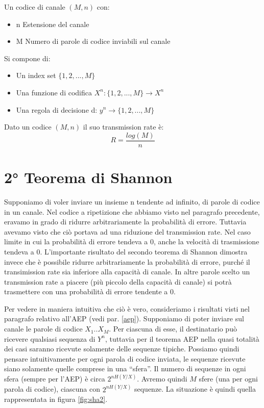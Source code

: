 \begin{definizione}
Un codice di canale $(M,n)$ con:
\begin{itemize}
 \item n Estensione del canale
 \item M Numero di parole di codice inviabili sul canale
\end{itemize}
Si compone di:
\begin{itemize}
 \item Un index set $\{1,2,...,M\}$
 \item Una funzione di codifica $X^n: \{1,2,...,M\} \to X^n$
 \item Una regola di decisione d: $y^n \to \{1,2,...,M\}$
\end{itemize}

\end{definizione}

\begin{osservazione}
 Dato un codice $(M,n)$ il suo transmission rate è:
\[
 R=\frac{log(M)}{n}
\]

\end{osservazione}

\section{2° Teorema di Shannon}
Supponiamo di voler inviare un insieme n tendente ad infinito, di parole di codice in un canale. Nel codice a ripetizione che abbiamo visto nel paragrafo precedente, eravamo in grado di ridurre arbitrariamente la probabilità di errore. Tuttavia avevamo visto che ciò 
portava ad una riduzione del transmission rate. Nel caso limite in cui la probabilità di errore tendeva a 0, anche la velocità di trasmissione tendeva a 0.
L'importante risultato del secondo teorema di Shannon dimostra invece che è possibile ridurre arbitrariamente la probabilità di errore, 
purché il transimission rate sia inferiore alla capacità di canale. In altre parole scelto un transmission rate a piacere (più piccolo della capacità di canale) si potrà trasmettere con una probabilità di errore tendente a 0.

Per vedere in maniera intuitiva che ciò è vero, consideriamo i risultati visti nel paragrafo relativo all'AEP (vedi par. \ref{aep}).
Supponiamo di poter inviare sul canale le parole di codice $X_1..X_M$. Per ciascuna di esse, il destinatario può ricevere qualsiasi 
sequenza di $Y^n$, tuttavia per il teorema AEP nella quasi totalità dei casi saranno ricevute solamente delle sequenze tipiche.
Possiamo quindi pensare intuitivamente per ogni parola di codice inviata, le sequenze ricevute siano solamente quelle comprese in una 
``sfera''. Il numero di sequenze in ogni sfera (sempre per l'AEP) è circa $2^{n H(Y/X)}$. Avremo quindi $M$ sfere (una per ogni parola di codice), ciascuna con $2^{n H(Y/X)}$ sequenze. La situazione è quindi quella rappresentata in figura \ref{fig:sha2}.

